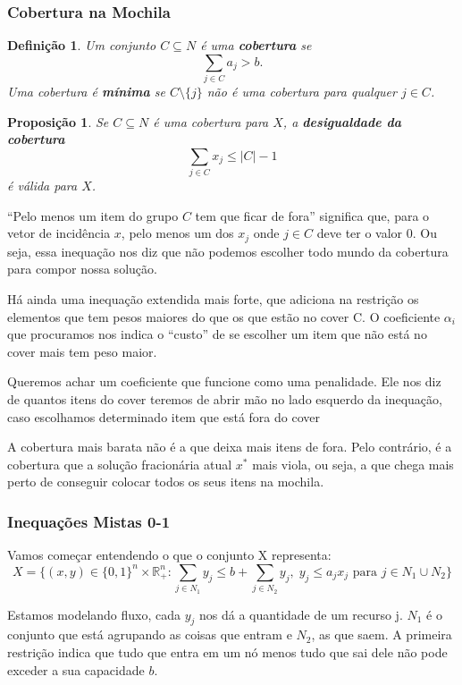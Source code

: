 \documentclass[12pt,a4paper]{article}
\newtheorem{definition}{Definição}[section]
\newtheorem{proposition}{Proposição}[section]
\begin{document}
\subsubsection{Cobertura na Mochila}

\begin{definition}
Um conjunto $C \subseteq N$ é uma \textbf{cobertura} se
$$ \sum_{j \in C} a_j > b. $$
Uma cobertura é \textbf{mínima} se $C \setminus \{j\}$ não é uma cobertura para qualquer $j \in C$.
\end{definition}

\begin{proposition}
Se $C \subseteq N$ é uma cobertura  para $X$, a \textbf{desigualdade da cobertura}
$$ \sum_{j \in C} x_j \le |C| - 1 $$
é válida para $X$.
\end{proposition}

``Pelo menos um item do grupo $C$ tem que ficar de fora'' significa que, para o vetor de incidência $x$, pelo menos um dos $x_j$ onde $j \in C$ deve ter o valor 0. Ou seja, essa inequação nos diz que não podemos escolher todo mundo da cobertura para compor nossa solução.

Há ainda uma inequação extendida mais forte, que adiciona na restrição os elementos que tem pesos maiores do que os que estão no cover C.
O coeficiente $\alpha_{i}$ que procuramos nos indica o ``custo'' de se escolher um item que não está no cover mais tem peso maior.

Queremos achar um coeficiente que funcione como uma penalidade. Ele nos diz de quantos itens do cover teremos de abrir mão no lado esquerdo da inequação, caso escolhamos determinado item que está fora do cover

A cobertura mais barata não é a que deixa mais itens de fora. Pelo contrário, é a cobertura que a solução fracionária atual $x^*$ mais viola, ou seja, a que chega mais perto de conseguir colocar todos os seus itens na mochila. 

\subsubsection{Inequações Mistas 0-1}

Vamos começar entendendo o que o conjunto X representa:
\[
X = \{(x, y) \in \{0,1\}^n \times \mathbb{R}_+^n : \sum_{j \in N_1} y_j \leq b + \sum_{j \in N_2} y_j, \; y_j \leq a_j x_j \text{ para } j \in N_1 \cup N_2\}
\]

Estamos modelando fluxo, cada $y_{j}$ nos dá a quantidade de um recurso j. $N_1$ é o conjunto que está agrupando as coisas que entram e $N_2$, as que saem. A primeira restrição indica que tudo que entra em um nó menos tudo que sai dele não pode exceder a sua capacidade $b$. 
\end{document}
